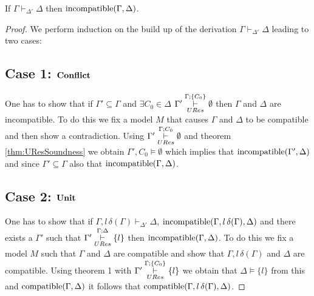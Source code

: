%
\begin{mytheorem}
If  $\Gamma \vdash_{\Delta'} \Delta$  then $\mathrm{incompatible}(\Gamma,\Delta)$.
\begin{proof}
We perform induction on the build up of the derivation $\Gamma \vdash_{\Delta'} \Delta$ leading to two cases:
%
\subsection*{Case 1: $\mathbf{Conflict}$}
One has to show that if $\Gamma' \subseteq \Gamma$ and $\exists C_0 \in \Delta$ $\Gamma' \overset{\Gamma;\{ C_0 \}}{\underset{URes}{\vdash}} \emptyset$ then $\Gamma$ and $\Delta$ are incompatible. To do this we fix a model $M$ that causes $\Gamma$ and $\Delta$ to be compatible and then show a contradiction. Using $\Gamma' \overset{\Gamma;C_0}{\underset{URes}{\vdash}} \emptyset$ and theorem \ref{thm:UResSoundness} we obtain $\Gamma', C_0 \models \emptyset$ which implies that $\mathrm{incompatible}(\Gamma',\Delta)$ and since $\Gamma' \subseteq \Gamma$ also that $\mathrm{incompatible}(\Gamma,\Delta)$. 
%
\subsection*{Case 2: $\mathbf{Unit}$}
One has to show that if $\Gamma, l \, \delta(\Gamma) \vdash_{\Delta'} \Delta$, $\mathrm{incompatible}(\Gamma,l \, \delta(\Gamma),\Delta)$ and there exists a $\Gamma'$ such that  $\Gamma' \overset{\Gamma;\Delta}{\underset{URes}{\vdash}} \{ l \}$ then $\mathrm{incompatible}(\Gamma,\Delta)$. To do this we fix a model $M$ such that $\Gamma$ and $\Delta$ are compatible and show that $\Gamma, l \, \delta(\Gamma)$ and $\Delta$ are compatible. Using theorem 1 with $\Gamma' \overset{\Gamma;\{ C_0\}}{\underset{URes}{\vdash}} \{ l \}$ we obtain that $\Delta \models \{l\}$ from this and $\mathrm{compatible}(\Gamma,\Delta)$ it follows that $\mathrm{compatible}(\Gamma, l \, \delta(\Gamma),\Delta)$.



\end{proof}
\end{mytheorem}
